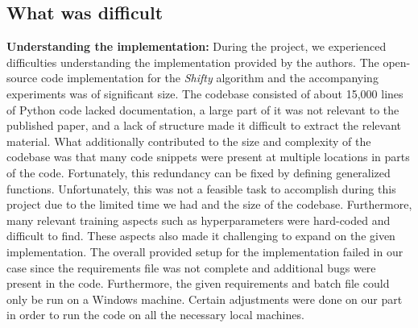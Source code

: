 \subsection{What was difficult}


\textbf{Understanding the implementation:}
During the project, we experienced difficulties understanding the implementation provided by the authors. The open-source code implementation for the \textit{Shifty} algorithm and the accompanying experiments was of significant size. The codebase consisted of about 15,000 lines of Python code lacked documentation, a large part of it was not relevant to the published paper, and a lack of structure made it difficult to extract the relevant material. What additionally contributed to the size and complexity of the codebase was that many code snippets were present at multiple locations in parts of the code. Fortunately, this redundancy can be fixed by defining generalized functions. Unfortunately, this was not a feasible task to accomplish during this project due to the limited time we had and the  size of the codebase. Furthermore, many relevant training aspects such as hyperparameters were hard-coded and difficult to find. These aspects also made it challenging to expand on the given implementation.
The overall provided setup for the implementation failed in our case since the requirements file was not complete and additional bugs were present in the code. Furthermore, the given requirements and batch file could only be run on a Windows machine. Certain adjustments were done on our part in order to run the code on all the necessary local machines. \\

